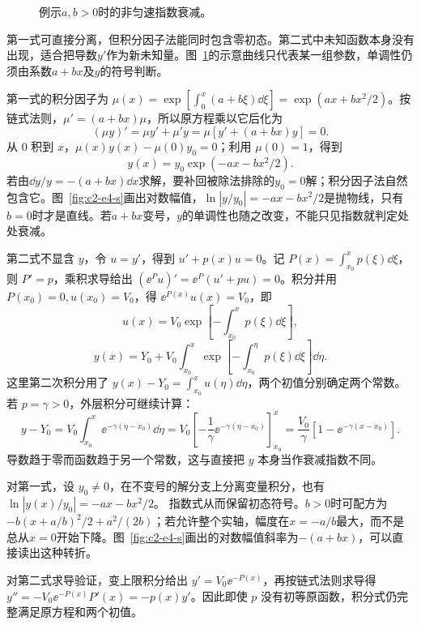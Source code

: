 \begin{figure}[H]\centering
{}
\caption{例示$a,b>0$时的非匀速指数衰减。}\label{fig:c2-e4-q}
\end{figure}
\begin{solution}
第一式可直接分离，但积分因子法能同时包含零初态。第二式中未知函数本身没有出现，适合把导数$y'$作为新未知量。图~\ref{fig:c2-e4-q}的示意曲线只代表某一组参数，单调性仍须由系数$a+bx$及$y$的符号判断。


第一式的积分因子为 $\mu(x)=\exp[\int_0^x(a+b\xi)\dd\xi]=\exp(ax+bx^2/2)$。按链式法则，$\mu'=(a+bx)\mu$，所以原方程乘以它后化为
\[
(\mu y)'=\mu y'+\mu'y=\mu[y'+(a+bx)y]=0.
\]
从 $0$ 积到 $x$，$\mu(x)y(x)-\mu(0)y_0=0$；利用 $\mu(0)=1$，得到
\[\boxed{y(x)=y_0\exp(-ax-bx^2/2)}.
\]
若由$\dd y/y=-(a+bx)\dd x$求解，要补回被除法排除的$y_0=0$解；积分因子法自然包含它。图~\ref{fig:c2-e4-s}画出对数幅值，$\ln|y/y_0|=-ax-bx^2/2$是抛物线，只有$b=0$时才是直线。若$a+bx$变号，$y$的单调性也随之改变，不能只见指数就判定处处衰减。

第二式不显含 $y$，令 $u=y'$，得到 $u'+p(x)u=0$。记 $P(x)=\int_{x_0}^xp(\xi)\dd\xi$，则 $P'=p$，乘积求导给出 $(\ee^Pu)'=\ee^P(u'+pu)=0$。积分并用 $P(x_0)=0,u(x_0)=V_0$，得 $\ee^{P(x)}u(x)=V_0$，即
\[u(x)=V_0\exp\left[-\int_{x_0}^x p(\xi)\dd\xi\right],
\]
\[\boxed{y(x)=Y_0+V_0\int_{x_0}^x
\exp\left[-\int_{x_0}^{\eta}p(\xi)\dd\xi\right]\dd\eta}.
\]
这里第二次积分用了 $y(x)-Y_0=\int_{x_0}^xu(\eta)\dd\eta$，两个初值分别确定两个常数。若 $p=\gamma>0$，外层积分可继续计算：
\[
y-Y_0=V_0\int_{x_0}^x\ee^{-\gamma(\eta-x_0)}\dd\eta
=V_0\left[-\frac1\gamma\ee^{-\gamma(\eta-x_0)}\right]_{x_0}^x
=\frac{V_0}{\gamma}[1-\ee^{-\gamma(x-x_0)}].
\]
导数趋于零而函数趋于另一个常数，这与直接把 $y$ 本身当作衰减指数不同。


对第一式，设 $y_0\ne0$，在不变号的解分支上分离变量积分，也有 $\ln|y(x)/y_0|=-ax-bx^2/2$。
指数式从而保留初态符号。$b>0$时可配方为$-b(x+a/b)^2/2+a^2/(2b)$；若允许整个实轴，幅度在$x=-a/b$最大，而不是总从$x=0$开始下降。图~\ref{fig:c2-e4-s}画出的对数幅值斜率为$-(a+bx)$，可以直接读出这种转折。

对第二式求导验证，变上限积分给出 $y'=V_0\ee^{-P(x)}$，再按链式法则求导得 $y''=-V_0\ee^{-P(x)}P'(x)=-p(x)y'$。因此即使 $p$ 没有初等原函数，积分式仍完整满足原方程和两个初值。


\end{solution}
